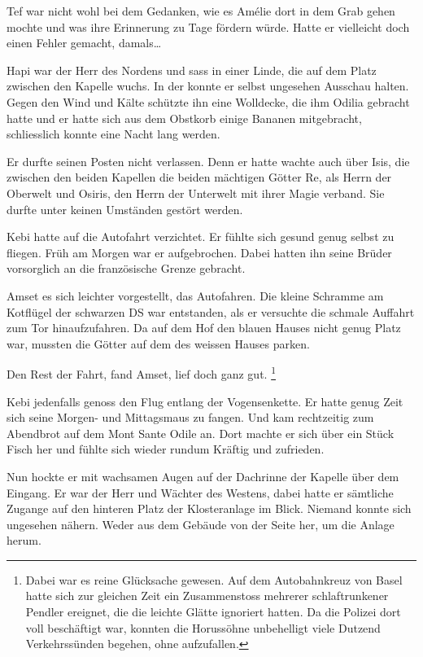 \documentclass[11pt,titlepage,a5paper]{book}
\begin{document}
Tef war nicht wohl bei dem Gedanken, wie es Amélie dort in dem Grab gehen mochte und was ihre Erinnerung zu Tage fördern würde. Hatte er vielleicht doch einen Fehler gemacht, damals\dots 

Hapi war der Herr des Nordens und sass in einer Linde, die auf dem Platz zwischen den Kapelle wuchs. In der konnte er selbst ungesehen Ausschau halten. Gegen den Wind und Kälte schützte ihn eine Wolldecke, die ihm Odilia gebracht hatte und er hatte sich aus dem Obstkorb einige Bananen mitgebracht, schliesslich konnte eine Nacht lang werden.

Er durfte seinen Posten nicht verlassen. Denn er hatte wachte auch über Isis, die zwischen den beiden Kapellen die beiden mächtigen Götter Re, als Herrn der Oberwelt und Osiris, den Herrn der Unterwelt mit ihrer Magie verband. Sie durfte unter keinen Umständen gestört werden.

Kebi hatte auf die Autofahrt verzichtet. Er fühlte sich gesund genug selbst zu fliegen. Früh am Morgen war er aufgebrochen. Dabei hatten ihn seine Brüder vorsorglich an die französische Grenze gebracht. 

Amset es sich leichter vorgestellt, das Autofahren. Die kleine Schramme am Kotflügel der schwarzen DS war entstanden, als er versuchte die schmale Auffahrt zum Tor hinaufzufahren. Da auf dem Hof den blauen Hauses nicht genug Platz war, mussten die Götter auf dem des weissen Hauses parken.

Den Rest der Fahrt, fand Amset, lief doch ganz gut. \footnote{Dabei war es reine Glücksache gewesen. Auf dem Autobahnkreuz von Basel hatte sich zur gleichen Zeit ein Zusammenstoss mehrerer schlaftrunkener Pendler ereignet, die die leichte Glätte ignoriert hatten. Da die Polizei dort voll beschäftigt war, konnten die Horussöhne unbehelligt viele Dutzend Verkehrssünden begehen, ohne aufzufallen.}

Kebi jedenfalls genoss den Flug entlang der Vogensenkette. Er hatte genug Zeit sich seine Morgen- und Mittagsmaus zu fangen. Und kam rechtzeitig zum Abendbrot auf dem Mont Sante Odile an. Dort machte er sich über ein Stück Fisch her und fühlte sich wieder rundum Kräftig und zufrieden.

Nun hockte er mit wachsamen Augen auf der Dachrinne der Kapelle über dem Eingang. Er war der Herr und Wächter des Westens, dabei hatte er sämtliche Zugange auf den hinteren Platz der Klosteranlage im Blick. Niemand konnte sich ungesehen nähern. Weder aus dem Gebäude von der Seite her, um die Anlage herum.
\end{document}
